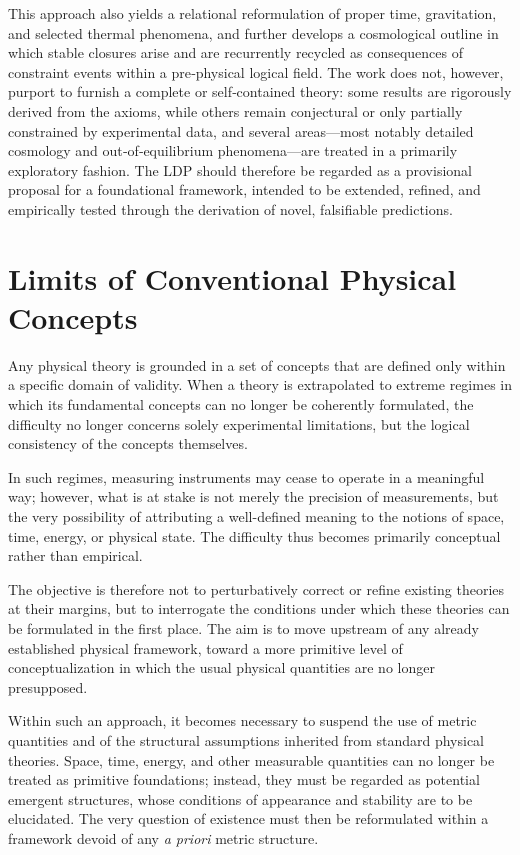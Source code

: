 \documentclass[11pt,a4paper]{article}
\begin{document}
This approach also yields a relational reformulation of proper time, gravitation, and selected thermal phenomena, and further develops a cosmological outline in which stable closures arise and are recurrently recycled as consequences of constraint events within a pre‑physical logical field. The work does not, however, purport to furnish a complete or self‑contained theory: some results are rigorously derived from the axioms, while others remain conjectural or only partially constrained by experimental data, and several areas—most notably detailed cosmology and out‑of‑equilibrium phenomena—are treated in a primarily exploratory fashion. The LDP should therefore be regarded as a provisional proposal for a foundational framework, intended to be extended, refined, and empirically tested through the derivation of novel, falsifiable predictions.

\newpage

\section{Limits of Conventional Physical Concepts}

Any physical theory is grounded in a set of concepts that are defined only within a specific domain of validity. When a theory is extrapolated to extreme regimes in which its fundamental concepts can no longer be coherently formulated, the difficulty no longer concerns solely experimental limitations, but the logical consistency of the concepts themselves.

In such regimes, measuring instruments may cease to operate in a meaningful way; however, what is at stake is not merely the precision of measurements, but the very possibility of attributing a well-defined meaning to the notions of space, time, energy, or physical state. The difficulty thus becomes primarily conceptual rather than empirical.

The objective is therefore not to perturbatively correct or refine existing theories at their margins, but to interrogate the conditions under which these theories can be formulated in the first place. The aim is to move upstream of any already established physical framework, toward a more primitive level of conceptualization in which the usual physical quantities are no longer presupposed.

Within such an approach, it becomes necessary to suspend the use of metric quantities and of the structural assumptions inherited from standard physical theories. Space, time, energy, and other measurable quantities can no longer be treated as primitive foundations; instead, they must be regarded as potential emergent structures, whose conditions of appearance and stability are to be elucidated. The very question of existence must then be reformulated within a framework devoid of any \emph{a priori} metric structure.
\end{document}

